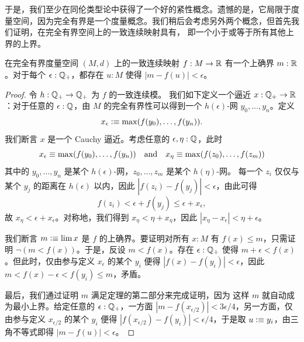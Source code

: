 于是，我们至少在同伦类型论中获得了一个好的紧性概念。遗憾的是，它局限于度量空间，因为完全有界是一个度量概念。我们稍后会考虑另外两个概念，但首先我们证明，在完全有界空间上的一致连续映射具有，
%
即一个小于或等于所有其他上界的上界。

\begin{thm} \label{ctb-uniformly-continuous-sup}
  在完全有界度量空间 $(M, d)$ 上的一致连续映射 $f : M \to \mathbb{R}$ 有一个上确界 $m : \mathbb{R}$。对于每个 $\epsilon : \mathbb{Q}_{+}$，都存在 $u : M$ 使得 $|m - f(u)| < \epsilon$。
\end{thm}

\begin{proof}
  令 $h : \mathbb{Q}_{+} \to \mathbb{Q}_{+}$ 为 $f$ 的一致连续模。
  我们如下定义一个逼近 $x : \mathbb{Q}_{+} \to \mathbb{R}$：对于任意的 $\epsilon : \mathbb{Q}$，由 $M$ 的完全有界性可以得到一个 $h(\epsilon)$-网 $y_0, \ldots, y_n$。定义
  \begin{equation*}
    x_\epsilon \vcentcolon\equiv \max (f(y_0), \ldots, f(y_n)).
  \end{equation*}
  我们断言 $x$ 是一个 Cauchy 逼近。考虑任意的 $\epsilon, \eta : \mathbb{Q}$，此时
  \begin{equation*}
    x_\epsilon \equiv \max (f(y_0), \ldots, f(y_n))
    \quad\text{and}\quad
    x_\eta \equiv \max (f(z_0), \ldots, f(z_m))
  \end{equation*}
  其中的 $y_0, \ldots, y_n$ 是某个 $h(\epsilon)$-网，$z_0, \ldots, z_m$ 是某个 $h(\eta)$-网。
  每一个 $z_i$ 仅仅与某个 $y_j$ 的距离在 $h(\epsilon)$ 以内，因此 $|f(z_i) - f(y_j)| <
  \epsilon$，由此可得
  \begin{equation*}
    f(z_i) < \epsilon + f(y_j) \leq \epsilon + x_\epsilon,
  \end{equation*}
  故 $x_\eta < \epsilon + x_\epsilon$。对称地，我们得到 $x_\eta < \eta +
  x_\eta$，因此 $|x_\eta - x_\epsilon| < \eta + \epsilon$。

  我们断言 $m \vcentcolon\equiv \lim x$ 是 $f$ 的上确界。要证明对所有 $x : M$ 有 $f(x) \leq m$，只需证明 $\lnot (m < f(x))$。于是，反设 $m <
  f(x)$。存在 $\epsilon : \mathbb{Q}_{+}$ 使得 $m + \epsilon < f(x)$。但此时，仅由参与定义 $x_\epsilon$ 的某个 $y_i$ 便得 $|f(x) - f(y_i)| <
  \epsilon$，因此 $m < f(x) - \epsilon < f(y_i) \leq m$，矛盾。

  最后，我们通过证明 $m$ 满足定理的第二部分来完成证明，因为
  这样 $m$ 就自动成为最小上界。给定任意的 $\epsilon : \mathbb{Q}_{+}$，一方面
  $|m - f(x_{\epsilon/2})| < 3 \epsilon/4$，另一方面，仅由参与定义 $x_{\epsilon/2}$ 的某个 $y_i$ 便得 $|f(x_{\epsilon/2}) - f(y_i)| <
  \epsilon/4$，于是取 $u \vcentcolon\equiv y_i$，由三角不等式即得 $|m - f(u)| < \epsilon$。
\end{proof}

